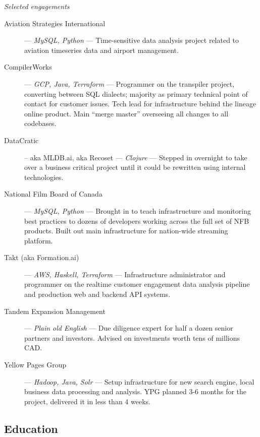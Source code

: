 \vspace{2 mm}

\textit{\large Selected engagements}
\vspace{1 mm}
\begin{description}
\item[Aviation Strategies International] --- \textit{MySQL, Python} --- Time-sensitive data analysis project related to aviation timeseries data and airport management.
\vspace{1 mm}
\item[CompilerWorks] --- \textit{GCP, Java, Terraform} --- Programmer on the transpiler project, converting between SQL dialects; majority as primary technical point of contact for customer issues. Tech lead for infrastructure behind the lineage online product. Main ``merge master'' overseeing all changes to all codebases.
\vspace{1 mm}
\item[DataCratic] -- aka MLDB.ai, aka Recoset --- \textit{Clojure} --- Stepped in overnight to take over a business critical project until it could be rewritten using internal technologies.
\vspace{1 mm}
\item[National Film Board of Canada] --- \textit{MySQL, Python} --- Brought in to teach infrastructure and monitoring best practices to dozens of developers working across the full set of NFB products. Built out main infrastructure for nation-wide streaming platform.
\vspace{1 mm}
\item[Takt (aka Formation.ai)] --- \textit{AWS, Haskell, Terraform} --- Infrastructure administrator and programmer on the realtime customer engagement data analysis pipeline and production web and backend API systems.
\vspace{1 mm}
\item[Tandem Expansion Management] --- \textit{Plain old English} --- Due diligence expert for half a dozen senior partners and investors. Advised on investments worth tens of millions CAD.
\vspace{1 mm}
\item[Yellow Pages Group] --- \textit{Hadoop, Java, Solr} --- Setup infrastructure for new search engine, local business data processing and analysis. YPG planned 3-6 months for the project, delivered it in less than 4 weeks.
\end{description}

\begin{langen}
\section{Education}
\end{langen}

\begin{langen}
\end{langen}
